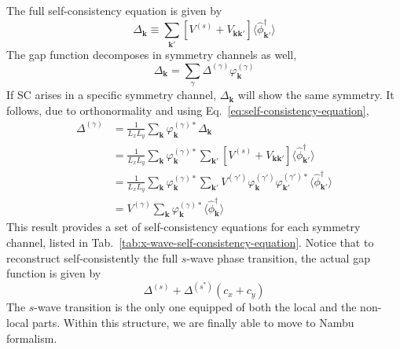 The full self-consistency equation is given by
\begin{equation}\label{eq:self-consistency-equation}
	\Delta_\mathbf{k} \equiv \sum_{\mathbf{k}'}
	\left[
		V^{(s)} +
		V_{\mathbf{k}\mathbf{k}'}
	\right]
	\langle
		\hat \phi_{\mathbf{k}'}^\dagger
	\rangle
\end{equation}
The gap function decomposes in symmetry channels as well,
\[
\Delta_\mathbf{k} = \sum_\gamma \Delta^{(\gamma)} \varphi_\mathbf{k}^{(\gamma)}
\]
If SC arises in a specific symmetry channel, $\Delta_\mathbf{k}$ will show the same symmetry. It follows, due to orthonormality and using Eq.~\eqref{eq:self-consistency-equation},
\begin{align}
	\Delta^{(\gamma)} &= \frac{1}{L_xL_y} \sum_{\mathbf{k}} \varphi_\mathbf{k}^{(\gamma)*} \Delta_\mathbf{k} \nonumber \\
	&= \frac{1}{L_xL_y} \sum_{\mathbf{k}} \varphi_\mathbf{k}^{(\gamma)*} \sum_{\mathbf{k}'}
	\left[
		V^{(s)} +
	V_{\mathbf{k}\mathbf{k}'}
	\right]
	\langle
		\hat \phi_{\mathbf{k}'}^\dagger
	\rangle \nonumber \\
	&= \frac{1}{L_xL_y} \sum_{\mathbf{k}} \varphi_\mathbf{k}^{(\gamma)*} \sum_{\mathbf{k}'}
	V^{(\gamma')} \varphi_\mathbf{k}^{(\gamma')} \varphi_{\mathbf{k}'}^{(\gamma')*}
	\langle
		\hat \phi_{\mathbf{k}'}^\dagger
	\rangle \nonumber \\
	&= V^{(\gamma)} \sum_{\mathbf{k}} \varphi_\mathbf{k}^{(\gamma)*} \langle
		\hat \phi_{\mathbf{k}}^\dagger
	\rangle \label{eq:self-consistency-equation-explicit}
\end{align}
This result provides a set of self-consistency equations for each symmetry channel, listed in Tab.~\ref{tab:x-wave-self-consistency-equation}. Notice that to reconstruct self-consistently the full $s$-wave phase transition, the actual gap function is given by
\[
	\Delta^{(s)} + \Delta^{(s^*)} (c_x + c_y)
\]
The $s$-wave transition is the only one equipped of both the local and the non-local parts. Within this structure, we are finally able to move to Nambu formalism.

